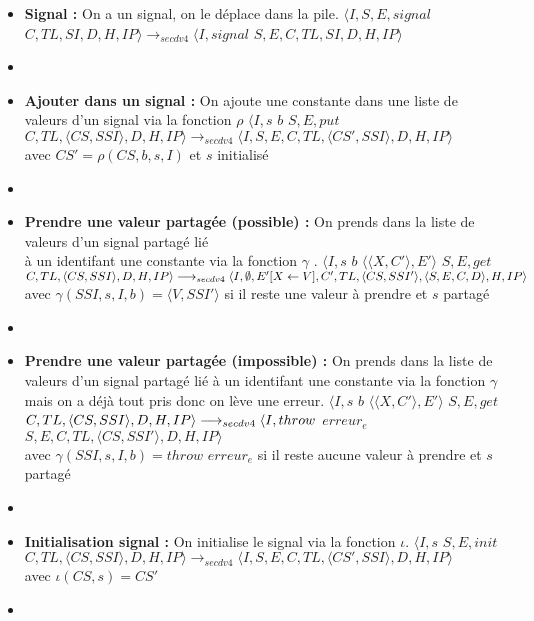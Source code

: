 \documentclass[10pt,a4paper]{article}
\begin{document}
\begin{enumerate}
\begin{itemize}
					\item[]  \textbf{Signal :} On a un signal, on le déplace dans la pile.
					\smallbreak 
					$\langle I,S,E,signal$ $C,TL,SI,D,H,IP\rangle
					\longrightarrow_{secdv4} \langle I,signal$ $S,E,C,TL,SI,D,H,IP\rangle$
					\item[]
					
					\item[] \textbf{Ajouter dans un signal :} On ajoute une constante dans une liste de valeurs d'un signal via la fonction $\rho$
					\smallbreak
					$\langle I,s$ $b$ $S,E,put$ $C,TL,\langle CS,SSI\rangle,D,H,IP\rangle \longrightarrow_{secdv4} \langle I,S,E,C,TL,\langle CS',SSI\rangle,D,H,IP\rangle$ \\
					avec $CS' = \rho(CS,b,s,I)$ et $s$ initialisé
					\item[]
					
					\item[] \textbf{Prendre une valeur partagée (possible) :} On prends dans la liste de valeurs d'un signal partagé lié \\
					à un identifant une constante via la fonction $\gamma$ .
					\smallbreak
					$\langle I,s$ $b$ $\langle\langle X,C'\rangle,E'\rangle$ $S,E,get$ $C,TL,\langle CS,SSI\rangle,D,H,IP\rangle 
					\\\longrightarrow_{secdv4} \langle I,\emptyset,E'[X \leftarrow V],C',TL,\langle CS,SSI'\rangle,\langle S,E,C,D\rangle,H,IP\rangle$\\
					avec $ \gamma(SSI,s,I,b) = \langle V,SSI'\rangle$ si il reste une valeur à prendre et $s$ partagé
					\item[]
					
					\item[] \textbf{Prendre une valeur partagée (impossible) :} On prends dans la liste de valeurs d'un signal partagé lié à un identifant une constante via la fonction $\gamma$ mais on a déjà tout pris donc on lève une erreur.
					\smallbreak 
					$\langle I,s$ $b$ $\langle\langle X,C'\rangle,E'\rangle$ $S,E,get$ $C,TL,\langle CS,SSI\rangle,D,H,IP\rangle 
					\\\longrightarrow_{secdv4} \langle I,throw$ $erreur_{e}$ $S,E,C,TL,\langle CS,SSI'\rangle,D,H,IP\rangle$\\
					avec $ \gamma(SSI,s,I,b) = throw$ $erreur_{e}$ si il reste aucune valeur à prendre et $s$ partagé
					\item[]
					
					\item[] \textbf{Initialisation signal :} On initialise le signal via la fonction $\iota$.
					\smallbreak 
					$\langle I,s$ $S,E,init$ $C,TL,\langle CS,SSI\rangle,D,H,IP\rangle 
					\longrightarrow_{secdv4} \langle I,S,E,C,TL,\langle CS',SSI\rangle,D,H,IP\rangle$\\
					avec $\iota(CS,s) = CS'$
					\item[]	
					

\end{itemize}
\end{enumerate}
\end{document}

